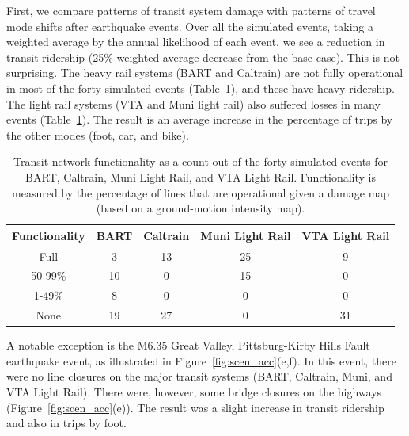 First, we compare patterns of transit system damage with patterns of travel mode shifts after earthquake events. Over all the simulated events, taking a weighted average by the annual likelihood of each event, we see a reduction in transit ridership (25\% weighted average decrease from the base case). This is not surprising. The heavy rail systems (BART and Caltrain) are not fully operational in most of the forty simulated events (Table~\ref{tab:transit}), and these have heavy ridership. The light rail systems (VTA and Muni light rail) also suffered losses in many events (Table~\ref{tab:transit}). %
 The result is an average increase in the percentage of trips by the other modes (foot, car, and bike). 

\begin{table}
\centering
\begin{tabular}{c||c|c|c|c}
\textbf{Functionality}           & \textbf{BART} & \textbf{Caltrain} & \textbf{Muni Light Rail} & \textbf{VTA Light Rail}  \\
\hline
Full & 3 & 13 & 25 & 9\\
50-99\%  & 10 & 0 & 15 & 0\\
1-49\%  & 8 & 0 & 0 & 0\\
None & 19 & 27 & 0 & 31\\
\end{tabular}
\caption{Transit network functionality as a count out of the forty simulated events for BART, Caltrain, Muni Light Rail, and VTA Light Rail. Functionality is measured by the percentage of lines that are operational given a damage map (based on a ground-motion intensity map). }
\label{tab:transit}
\end{table}



A notable exception is the M6.35 Great Valley, Pittsburg-Kirby Hills Fault earthquake event, as illustrated in Figure~\ref{fig:scen_acc}{(e,f)}. In this event, there were no line closures on the major transit systems (BART, Caltrain, Muni, and VTA Light Rail). There were, however, some bridge closures on the highways (Figure~\ref{fig:scen_acc}{(e)}). The result was a slight increase in transit ridership and also in trips by foot.


